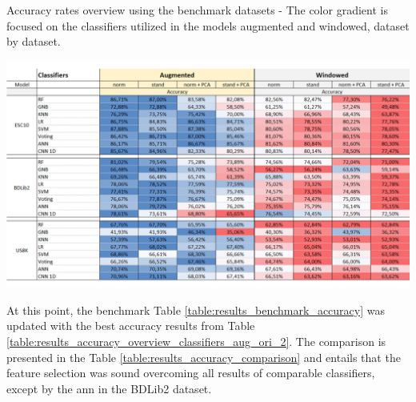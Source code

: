 \begin{table}[ht!]
    \caption[Accuracy rates overview using the benchmark datasets - Models augmented x windowed (Focus on the classifiers dataset by dataset)]{Accuracy rates overview using the benchmark datasets - The color gradient is focused on the classifiers utilized in the models augmented and windowed, dataset by dataset.}
    \label{table:results_accuracy_overview_features_windowed}
     \raggedright
    \includegraphics[width=1\textwidth]{resources/images/060-results/Results_classification_overview_aug_x_ori_3.png}
\end{table}

At this point, the benchmark Table \ref{table:results_benchmark_accuracy} was updated with the best accuracy results from Table \ref{table:results_accuracy_overview_classifiers_aug_ori_2}. The comparison is presented in the Table \ref{table:results_accuracy_comparison} and entails that the feature selection was sound overcoming all results of comparable classifiers, except by the \gls{ann} in the BDLib2 dataset.

